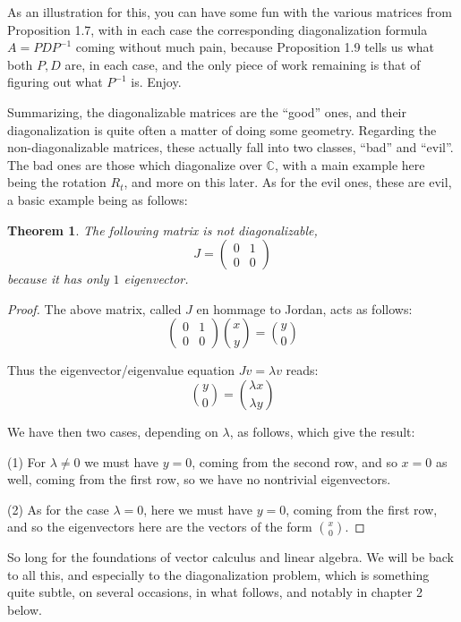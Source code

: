 \documentclass[12pt]{amsbook}
\newtheorem{theorem}{Theorem}[chapter]
\begin{document}
As an illustration for this, you can have some fun with the various matrices from Proposition 1.7, with in each case the corresponding diagonalization formula $A=PDP^{-1}$ coming without much pain, because Proposition 1.9 tells us what both $P,D$ are, in each case, and the only piece of work remaining is that of figuring out what $P^{-1}$ is. Enjoy.

\bigskip

Summarizing, the diagonalizable matrices are the ``good'' ones, and their diagonalization is quite often a matter of doing some geometry. Regarding the non-diagonalizable matrices, these actually fall into two classes, ``bad'' and ``evil''. The bad ones are those which diagonalize over $\mathbb C$, with a main example here being the rotation $R_t$, and more on this later. As for the evil ones, these are evil, a basic example being as follows:


\begin{theorem}
The following matrix is not diagonalizable,
$$J=\begin{pmatrix}0&1\\0&0\end{pmatrix}$$
because it has only $1$ eigenvector.
\end{theorem}

\begin{proof}
The above matrix, called $J$ en hommage to Jordan, acts as follows:
$$\begin{pmatrix}0&1\\0&0\end{pmatrix}\binom{x}{y}=\binom{y}{0}$$

Thus the eigenvector/eigenvalue equation $Jv=\lambda v$ reads:
$$\binom{y}{0}=\binom{\lambda x}{\lambda y}$$

We have then two cases, depending on $\lambda$, as follows, which give the result:

\medskip

(1) For $\lambda\neq0$ we must have $y=0$, coming from the second row, and so $x=0$ as well, coming from the first row, so we have no nontrivial eigenvectors. 

\medskip

(2) As for the case $\lambda=0$, here we must have $y=0$, coming from the first row, and so the eigenvectors here are the vectors of the form $\binom{x}{0}$. 
\end{proof}

So long for the foundations of vector calculus and linear algebra. We will be back to all this, and especially to the diagonalization problem, which is something quite subtle, on several occasions, in what follows, and notably in chapter 2 below.
\end{document}
